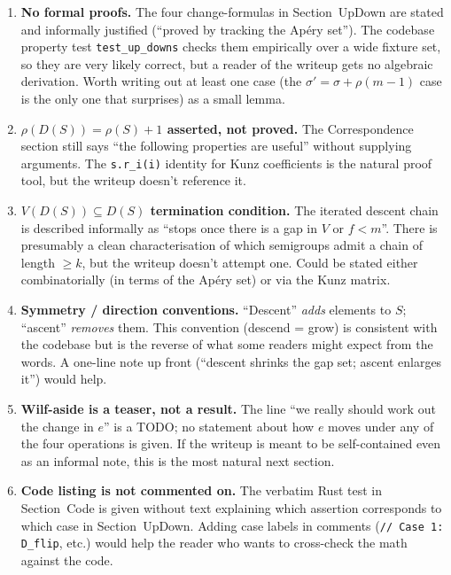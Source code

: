 \documentclass[11pt, a4paper]{article}
\begin{document}
\begin{enumerate}
    \item \textbf{No formal proofs.} The four change-formulas in
    Section~UpDown are stated and informally justified
    (``proved by tracking the Apéry set''). The codebase property
    test \verb|test_up_downs| checks them empirically over a wide
    fixture set, so they are very likely correct, but a reader of
    the writeup gets no algebraic derivation. Worth writing out at
    least one case (the $\sigma' = \sigma + \rho(m-1)$ case is the
    only one that surprises) as a small lemma.

    \item \textbf{$\rho(D(S)) = \rho(S) + 1$ asserted, not proved.}
    The Correspondence section still says ``the following
    properties are useful'' without supplying arguments. The
    \verb|s.r_i(i)| identity for Kunz coefficients is the natural
    proof tool, but the writeup doesn't reference it.

    \item \textbf{$V(D(S)) \subseteq D(S)$ termination condition.}
    The iterated descent chain is described informally as
    ``stops once there is a gap in $V$ or $f < m$''. There is
    presumably a clean characterisation of which semigroups admit
    a chain of length $\ge k$, but the writeup doesn't attempt one.
    Could be stated either combinatorially (in terms of the Apéry
    set) or via the Kunz matrix.

    \item \textbf{Symmetry / direction conventions.} ``Descent''
    \emph{adds} elements to $S$; ``ascent'' \emph{removes} them.
    This convention (descend = grow) is consistent with the
    codebase but is the reverse of what some readers might expect
    from the words. A one-line note up front (``descent shrinks
    the gap set; ascent enlarges it'') would help.

    \item \textbf{Wilf-aside is a teaser, not a result.} The line
    ``we really should work out the change in $e$'' is a TODO; no
    statement about how $e$ moves under any of the four operations
    is given. If the writeup is meant to be self-contained even as
    an informal note, this is the most natural next section.

    \item \textbf{Code listing is not commented on.} The verbatim
    Rust test in Section~Code is given without text explaining
    which assertion corresponds to which case in
    Section~UpDown. Adding case labels in comments
    (\verb|// Case 1: D_flip|, etc.) would help the reader who
    wants to cross-check the math against the code.


\end{enumerate}
\end{document}
